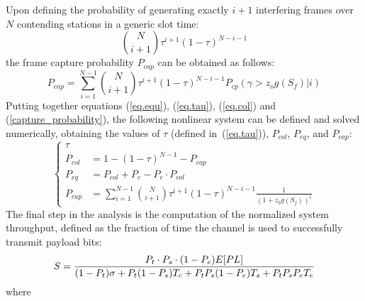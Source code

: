 \documentclass[10pt,onecolumn,a4paper]{IEEEtran}
\begin{document}
Upon defining the probability of generating exactly $i+1$
interfering frames over $N$ contending stations in a generic slot
time:
\[
{N \choose i+1}\tau^{i+1}(1-\tau)^{N-i-1}
\]
the frame capture probability $P_{cap}$ can be obtained as follows:
\begin{equation}\label{capture_probability}
P_{cap}=\sum_{i=1}^{N-1}{N \choose
i+1}\tau^{i+1}(1-\tau)^{N-i-1}P_{cp}\left(\gamma>z_o
g(S_f)|i\right)
\end{equation}
Putting together equations (\ref{eq.equ}), (\ref{eq.tau}),
(\ref{eq.col}) and (\ref{capture_probability}), the following
nonlinear system can be defined and solved numerically, obtaining
the values of $\tau$ (defined in~(\ref{eq.tau})), $P_{col}$,
$P_{eq}$, and $P_{cap}$:
\begin{equation}\label{eq.system}
\left\{ \begin{array}{ll} \tau & \\
P_{col} &= 1-(1-\tau)^{N-1} -P_{cap}\\
P_{eq}   &=
P_{col}+P_e-P_e\cdot  P_{col}\\
P_{cap}&=\sum_{i=1}^{N-1}{N \choose
i+1}\tau^{i+1}(1-\tau)^{N-i-1}\frac{1}{{(1+z_{0}g(S_{f}))}^{i}}
\end{array} \right.
\end{equation}
The final step in the analysis is the computation of the
normalized system throughput, defined as the fraction of time the
channel is used to successfully transmit payload bits:
\begin{equation}\small
\label{eq.system2} S = \frac{P_t \cdot P_s\cdot
(1-P_e)E[PL]}{(1-P_t
)\sigma+P_t(1-P_s)T_c+P_tP_s(1-P_e)T_s+P_tP_sP_eT_e}
\end{equation}
where
\end{document}
